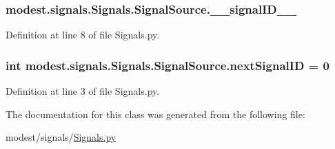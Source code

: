 \subsubsection[{\texorpdfstring{\+\_\+\+\_\+signal\+I\+D\+\_\+\+\_\+}{__signalID__}}]{\setlength{\rightskip}{0pt plus 5cm}modest.\+signals.\+Signals.\+Signal\+Source.\+\_\+\+\_\+signal\+I\+D\+\_\+\+\_\+\hspace{0.3cm}{\ttfamily [private]}}\hypertarget{classmodest_1_1signals_1_1Signals_1_1SignalSource_a3afbfc4131c4f3472589a7d8f55aae2c}{}\label{classmodest_1_1signals_1_1Signals_1_1SignalSource_a3afbfc4131c4f3472589a7d8f55aae2c}


Definition at line 8 of file Signals.\+py.

\subsubsection[{\texorpdfstring{next\+Signal\+ID}{nextSignalID}}]{\setlength{\rightskip}{0pt plus 5cm}int modest.\+signals.\+Signals.\+Signal\+Source.\+next\+Signal\+ID = 0\hspace{0.3cm}{\ttfamily [static]}}\hypertarget{classmodest_1_1signals_1_1Signals_1_1SignalSource_a58350fc8dfea4228a81fa469fc2305b3}{}\label{classmodest_1_1signals_1_1Signals_1_1SignalSource_a58350fc8dfea4228a81fa469fc2305b3}


Definition at line 3 of file Signals.\+py.



The documentation for this class was generated from the following file\+:\begin{DoxyCompactItemize}
\item 
modest/signals/\hyperlink{Signals_8py}{Signals.\+py}\end{DoxyCompactItemize}

